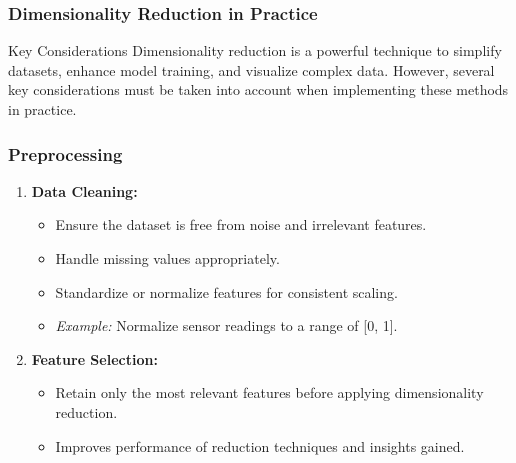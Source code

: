 \documentclass[aspectratio=169]{beamer}
\begin{document}
\begin{frame}[fragile]
    \frametitle{Dimensionality Reduction in Practice}
    \begin{block}{Key Considerations}
        Dimensionality reduction is a powerful technique to simplify datasets, enhance model training, and visualize complex data. However, several key considerations must be taken into account when implementing these methods in practice.
    \end{block}
\end{frame}

\begin{frame}[fragile]
    \frametitle{Preprocessing}
    \begin{enumerate}
        \item \textbf{Data Cleaning:} 
        \begin{itemize}
            \item Ensure the dataset is free from noise and irrelevant features.
            \item Handle missing values appropriately.
            \item Standardize or normalize features for consistent scaling.
            \item \textit{Example:} Normalize sensor readings to a range of [0, 1].
        \end{itemize}
        
        \item \textbf{Feature Selection:}
        \begin{itemize}
            \item Retain only the most relevant features before applying dimensionality reduction.
            \item Improves performance of reduction techniques and insights gained. 
        \end{itemize}
    \end{enumerate}
\end{frame}
\end{document}
